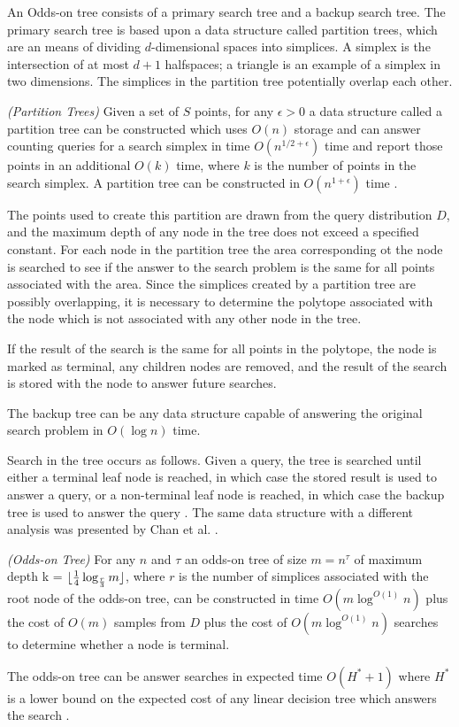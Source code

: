 \documentclass[mcs]{scsthesis}
\begin{document}
An Odds-on tree consists of a primary search tree and a backup search tree.
The primary search tree is based upon a data structure called partition trees,
which are an means of dividing \(d\)-dimensional spaces into simplices. A
simplex is the intersection of at most \(d + 1\) halfspaces; a triangle is an
example of a simplex in two dimensions. The simplices in the partition tree
potentially overlap each other.

\begin{thm} \emph{(Partition Trees)} 
Given a set of \(S\) points, for any \(\epsilon > 0\) a data structure called
a partition tree can be constructed which uses \(O(n)\) storage and can answer
counting queries for a search simplex in time \(O(n^{1/2 + \epsilon})\) time and
report those points in an additional \(O(k)\) time, where \(k\) is the number
of points in the search simplex. A partition tree can be constructed in
\(O(n^{1 + \epsilon})\) time \cite{dutch}.
\end{thm}

The points used to create this partition are drawn from the query distribution
\(D\), and the maximum depth of any node in the tree does not exceed a specified
constant. For each node in the partition tree the area corresponding ot the node
is searched to see if the answer to the search problem is the same for all points
associated with the area. Since the simplices created by a partition tree are
possibly overlapping, it is necessary to determine the polytope associated with
the node which is not associated with any other node in the tree.

If the result of the search is the same for all points in the polytope, the node
is marked as terminal, any children nodes are removed, and the result of the
search is stored with the node to answer future searches.

The backup tree can be any data structure capable of answering the original
search problem in \(O(\log n)\) time.

Search in the tree occurs as follows. Given a query, the tree is searched until
either a terminal leaf node is reached, in which case the stored result is used
to answer a query, or a non-terminal leaf node is reached, in which case the
backup tree is used to answer the query \cite{oddson}. The same data structure
with a different analysis was presented by Chan et al. \cite{chan}.

\begin{thm} \emph{(Odds-on Tree)}
For any \(n\) and \(\tau\) an odds-on tree of size \(m = n^\tau\) of maximum
depth k = \(\lfloor {1 \over 4} \log_{r \over 3} m \rfloor \), where \(r\) is
the number of simplices associated with the root node of the odds-on tree, can
be constructed in time \(O(m \log^{O(1)} n)\) plus the cost of \(O(m)\) samples
from \(D\) plus the cost of \(O(m \log^{O(1)} n)\) searches to determine whether
a node is terminal.

The odds-on tree can be answer searches in expected time \(O(H^* + 1)\) where
\(H^*\) is a lower bound on the expected cost of any linear decision tree
which answers the search \cite{oddson}.  
\end{thm}
\end{document}

